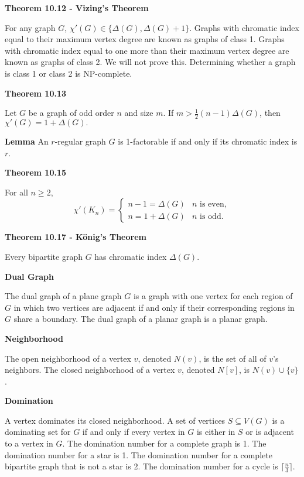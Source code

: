 \documentclass{article}
\begin{document}
\medskip\noindent\textbf{Theorem 10.12 - Vizing's Theorem}

    For any graph $G$, $\chi'(G) \in \{\Delta(G), \Delta(G) + 1\}$.
    Graphs with chromatic index equal to their maximum vertex degree are known as graphs of class 1.
    Graphs with chromatic index equal to one more than their maximum vertex degree are known as graphs of class 2.
    We will not prove this.
    Determining whether a graph is class 1 or class 2 is NP-complete.

\medskip\noindent\textbf{Theorem 10.13}

    Let $G$ be a graph of odd order $n$ and size $m$.
    If $m > \frac12 (n-1)\Delta(G)$, then $\chi'(G) = 1 + \Delta(G).$

\medskip\noindent\textbf{Lemma}
    An $r$-regular graph $G$ is 1-factorable if and only if its chromatic index is $r$.

\medskip\noindent\textbf{Theorem 10.15}

    For all $n \geq 2$, $$\chi'(K_n) = \begin{cases} n-1 = \Delta(G) & n \text{ is even}, \\ n = 1 + \Delta(G) & n \text{ is odd.} \end{cases}$$

\medskip\noindent\textbf{Theorem 10.17 - K\"onig's Theorem}

    Every bipartite graph $G$ has chromatic index $\Delta(G)$.

\medskip\noindent\textbf{Dual Graph}

    The dual graph of a plane graph $G$ is a graph with one vertex for each region of $G$ in which two vertices are adjacent if and only if their corresponding regions in $G$ share a boundary.
    The dual graph of a planar graph is a planar graph.

\medskip\noindent\textbf{Neighborhood}

    The open neighborhood of a vertex $v$, denoted $N(v)$, is the set of all of $v$'s neighbors.
    The closed neighborhood of a vertex $v$, denoted $N[v]$, is $N(v) \cup \{v\}$.

\medskip\noindent\textbf{Domination}

    A vertex dominates its closed neighborhood.
    A set of vertices $S \subseteq V(G)$ is a dominating set for $G$ if and only if every vertex in $G$ is either in $S$ or is adjacent to a vertex in $G$.
    The domination number for a complete graph is 1.
    The domination number for a star is 1.
    The domination number for a complete bipartite graph that is not a star is 2.
    The domination number for a cycle is $\lceil \frac n3 \rceil$.
\end{document}
